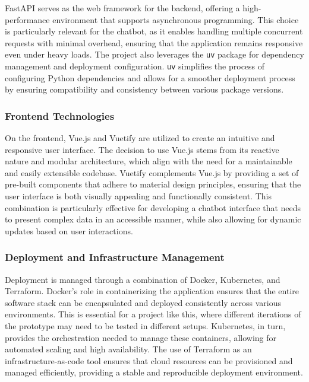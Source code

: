 
FastAPI serves as the web framework for the backend, offering a high-performance environment that supports asynchronous programming. This choice is particularly relevant for the chatbot, as it enables handling multiple concurrent requests with minimal overhead, ensuring that the application remains responsive even under heavy loads. The project also leverages the \texttt{uv} package for dependency management and deployment configuration. \texttt{uv} simplifies the process of configuring Python dependencies and allows for a smoother deployment process by ensuring compatibility and consistency between various package versions.

\subsubsection{Frontend Technologies}

On the frontend, Vue.js and Vuetify are utilized to create an intuitive and responsive user interface. The decision to use Vue.js stems from its reactive nature and modular architecture, which align with the need for a maintainable and easily extensible codebase. Vuetify complements Vue.js by providing a set of pre-built components that adhere to material design principles, ensuring that the user interface is both visually appealing and functionally consistent. This combination is particularly effective for developing a chatbot interface that needs to present complex data in an accessible manner, while also allowing for dynamic updates based on user interactions.

\subsubsection{Deployment and Infrastructure Management}

Deployment is managed through a combination of Docker, Kubernetes, and Terraform. Docker’s role in containerizing the application ensures that the entire software stack can be encapsulated and deployed consistently across various environments. This is essential for a project like this, where different iterations of the prototype may need to be tested in different setups. Kubernetes, in turn, provides the orchestration needed to manage these containers, allowing for automated scaling and high availability. The use of Terraform as an infrastructure-as-code tool ensures that cloud resources can be provisioned and managed efficiently, providing a stable and reproducible deployment environment.

